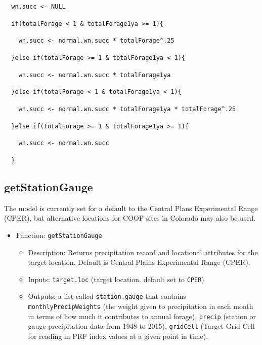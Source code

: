 \documentclass[11pt]{article}
\begin{document}
\verb!  wn.succ <- NULL!

\verb!  if(totalForage < 1 & totalForage1ya >= 1){!

\verb!    wn.succ <- normal.wn.succ * totalForage^.25!

\verb!  }else if(totalForage >= 1 & totalForage1ya < 1){!

\verb!    wn.succ <- normal.wn.succ * totalForage1ya!

\verb!  }else if(totalForage < 1 & totalForage1ya < 1){!

\verb!    wn.succ <- normal.wn.succ * totalForage1ya * totalForage^.25!

\verb!  }else if(totalForage >= 1 & totalForage1ya >= 1){!

\verb!    wn.succ <- normal.wn.succ!

\verb!  }!





\subsection{getStationGauge}
The model is currently set for a default to the Central Plans Experimental Range (CPER), but alternative locations for COOP sites in Colorado may also be used.

\begin{itemize}
\item Function: \verb!getStationGauge!
	\begin{itemize}
	\item Description: Returns precipitation record and locational attributes for the target
  location. Default is Central Plains Experimental Range (CPER).
  \item Inputs: \verb!target.loc! (target location. default set to \verb!CPER!)
  \item Outputs: a list called \verb!station.gauge! that contains \verb!monthlyPrecipWeights! (the weight given to precipitation in each month in terms of how much it contributes to annual forage), \verb!precip! (station or gauge precipitation data from 1948 to 2015), \verb!gridCell! (Target Grid Cell for reading in PRF index values at a given point in time).
	\end{itemize}
\end{itemize}
\end{document}
